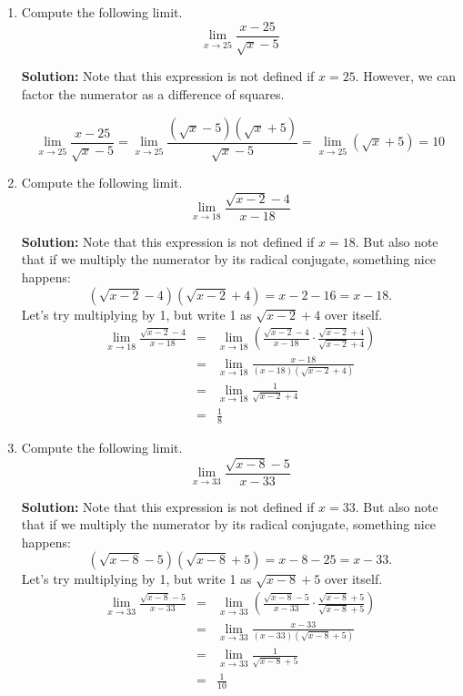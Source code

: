 \documentclass{article}
\begin{document}
\begin{enumerate}
  
\vspace{1cm}

\item Compute the following limit. \[ \lim_{x \rightarrow 25} \frac{x - 25}{\sqrt{x} - 5} \]

\textbf{Solution:} Note that this expression is not defined if $x = 25$. However, we can factor the numerator as a difference of squares.

\[ \lim_{x \rightarrow 25} \frac{x - 25}{\sqrt{x} - 5} = \lim_{x \rightarrow 25} \frac{(\sqrt{x} - 5)(\sqrt{x} + 5)}{\sqrt{x} - 5} = \lim_{x \rightarrow 25} (\sqrt{x} + 5) = 10 \]


  
\vspace{1cm}

\item Compute the following limit. \[ \lim_{x \rightarrow 18} \frac{\sqrt{x - 2} - 4}{x - 18} \]

\textbf{Solution:} Note that this expression is not defined if $x = 18$. But also note that if we multiply the numerator by its radical conjugate, something nice happens:
\[ \left(\sqrt{x - 2} - 4\right)\left(\sqrt{x - 2} + 4\right) = x - 2 - 16 = x - 18. \]
Let's try multiplying by 1, but write 1 as $\sqrt{x - 2} + 4$ over itself.
\begin{eqnarray*}
\lim_{x \rightarrow 18} \frac{\sqrt{x - 2} - 4}{x - 18} & = & \lim_{x \rightarrow 18} \left( \frac{\sqrt{x - 2} - 4}{x - 18} \cdot \frac{\sqrt{x - 2} + 4}{\sqrt{x - 2} + 4} \right) \\
 & = & \lim_{x \rightarrow 18} \frac{x - 18}{(x - 18)(\sqrt{x - 2} + 4)} \\
 & = & \lim_{x \rightarrow 18} \frac{1}{\sqrt{x - 2} + 4} \\
 & = & \frac{1}{8}
\end{eqnarray*}


  
\vspace{1cm}

\item Compute the following limit. \[ \lim_{x \rightarrow 33} \frac{\sqrt{x - 8} - 5}{x - 33} \]

\textbf{Solution:} Note that this expression is not defined if $x = 33$. But also note that if we multiply the numerator by its radical conjugate, something nice happens:
\[ \left(\sqrt{x - 8} - 5\right)\left(\sqrt{x - 8} + 5\right) = x - 8 - 25 = x - 33. \]
Let's try multiplying by 1, but write 1 as $\sqrt{x - 8} + 5$ over itself.
\begin{eqnarray*}
\lim_{x \rightarrow 33} \frac{\sqrt{x - 8} - 5}{x - 33} & = & \lim_{x \rightarrow 33} \left( \frac{\sqrt{x - 8} - 5}{x - 33} \cdot \frac{\sqrt{x - 8} + 5}{\sqrt{x - 8} + 5} \right) \\
 & = & \lim_{x \rightarrow 33} \frac{x - 33}{(x - 33)(\sqrt{x - 8} + 5)} \\
 & = & \lim_{x \rightarrow 33} \frac{1}{\sqrt{x - 8} + 5} \\
 & = & \frac{1}{10}
\end{eqnarray*}



\end{enumerate}
\end{document}
